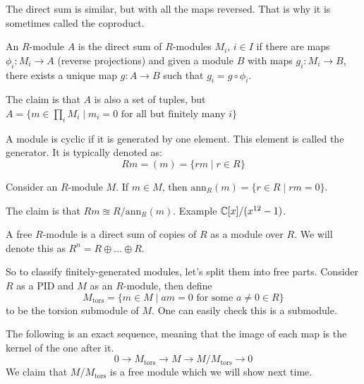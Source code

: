 The direct sum is similar, but with all the maps reversed. That is why it
is sometimes called the coproduct.
\begin{definition}
    An $R$-module $A$ is the direct sum of $R$-modules $M_i$, $i \in I$ if there are maps $\phi_i: M_i \to A$ (reverse projections) and given
    a module $B$ with maps $g_i: M_i \to B$, there exists a unique map $g: A \to B$ such that $g_i = g \circ \phi_i$.
\end{definition}
The claim is that $A$ is also a set of tuples, but $A = \{ m \in \prod_i M_i \mid m_i = 0 \text{ for all but finitely many $i$} \}$
\begin{definition}
    A module is cyclic if it is generated by one element. This element is called the generator. It is typically denoted as:
    \[ Rm = (m) = \{ rm \mid r \in R \} \]
\end{definition}
\begin{definition}
    Consider an $R$-module $M$. If $m \in M$, then $\textrm{ann}_R(m) = \{ r \in R \mid rm = 0\}$.
\end{definition}
The claim is that $Rm \approxeq R / \textrm{ann}_R(m)$. Example $\operatorname{\mathbb{C}}[x]/(x^{12} - 1)$.
\begin{definition}
    A free $R$-module is a direct sum of copies of $R$ as a module over $R$. We will denote this as $R^n = R \oplus \dots \oplus R$.
\end{definition}
So to classify finitely-generated modules, let's split them into free parts. Consider $R$ as a PID and $M$ as an $R$-module,
then define \[M_{\text{tors}} = \{m \in M \mid am = 0 \text{ for some $a \neq 0 \in R$}\}\] to be the torsion submodule of $M$.
One can easily check this is a submodule.

The following is an exact sequence, meaning that the image of each map is the kernel of the one after it.
\[ 0 \to M_{\text{tors}} \to M \to M / M_{\text{tors}} \to 0 \]
We claim that $M / M_{\text{tors}}$ is a free module which we will show next time.